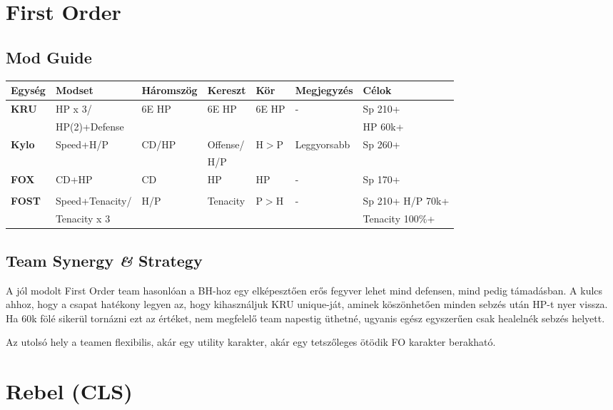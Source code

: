 \documentclass[11pt]{report}
\begin{document}
\chapter{First Order}
\section{Mod Guide}
\begin{center}
    \begin{tabular}{|l | l | l | l | l | l | l |}
        \hline
        Egység & Modset & Háromszög & Kereszt & Kör & Megjegyzés & Célok\\ \hline
        \textbf{KRU} & HP x 3/ & 6E HP & 6E HP & 6E HP & - & Sp 210+\\
        & HP(2)+Defense &  &  &  &  & HP 60k+\\ \hline
        \textbf{Kylo} & Speed+H/P & CD/HP & Offense/ & H$>$P & Leggyorsabb & Sp 260+\\
        &  &  & H/P &  &  & \\ \hline
        \textbf{FOX} & CD+HP & CD & HP & HP & - & Sp 170+\\
        &  &  &  &  &  & \\ \hline
        \textbf{FOST} & Speed+Tenacity/ & H/P & Tenacity & P$>$H & - & Sp 210+ H/P 70k+\\
        & Tenacity x 3 &  &  &  &  & Tenacity 100\%+\\ \hline
    \end{tabular}
\end{center}
\section{Team Synergy \textit{\&} Strategy}
A jól modolt First Order team hasonlóan a BH-hoz egy elképesztően erős fegyver lehet mind defensen, mind pedig támadásban. A kulcs ahhoz, hogy a csapat hatékony legyen az, hogy kihasználjuk KRU unique-ját, aminek köszönhetően minden sebzés után HP-t nyer vissza. Ha 60k fölé sikerül tornázni ezt az értéket, nem megfelelő team napestig üthetné, ugyanis egész egyszerűen csak healelnék sebzés helyett.\par
Az utolsó hely a teamen flexibilis, akár egy utility karakter, akár egy tetszőleges ötödik FO karakter berakható.

\chapter{Rebel (CLS)}
\end{document}
